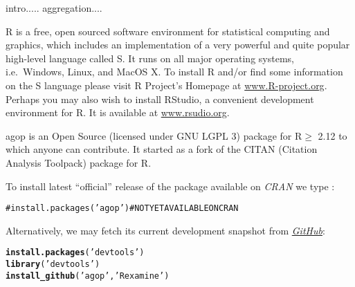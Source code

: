 \documentclass[11pt]{article}\usepackage{graphicx, color}
\makeatletter
\newcommand{\hlfunctioncall}[1]{\textcolor[rgb]{0.501960784313725,0,0.329411764705882}{\textbf{#1}}}%
\newcommand{\hlstring}[1]{\textcolor[rgb]{0.6,0.6,1}{#1}}%
\newcommand{\hlcomment}[1]{\textcolor[rgb]{0.180392156862745,0.6,0.341176470588235}{#1}}%
\newenvironment{kframe}{%
 \def\at@end@of@kframe{}%
 \ifinner\ifhmode%
  \def\at@end@of@kframe{\end{minipage}}%
  \begin{minipage}{\columnwidth}%
 \fi\fi%
 \def\FrameCommand##1{\hskip\@totalleftmargin \hskip-\fboxsep
 \colorbox{shadecolor}{##1}\hskip-\fboxsep
     \hskip-\linewidth \hskip-\@totalleftmargin \hskip\columnwidth}%
 \MakeFramed {\advance\hsize-\width
   \@totalleftmargin\z@ \linewidth\hsize
   \@setminipage}}%
 {\par\unskip\endMakeFramed%
 \at@end@of@kframe}
\newenvironment{knitrout}{}{} %
\newcommand{\package}[1]{\textsf{#1}\xspace}
\newcommand{\program}[1]{\textsf{#1}\xspace}
\newcommand{\os}[1]{\textsf{#1}\xspace}
\newcommand{\lang}[1]{\textsf{#1}\xspace}
\newcommand{\R}{\lang{R}}
\theoremstyle{remark}
\theoremstyle{definition}
\newif\ifDevelopmentVersion
\makeatother
\begin{document}
intro.....
aggregation.... \cite{GrabischETAL2009:aggregationfunctions}



\R \cite{Rproject:home} is a free, open sourced software environment
for statistical computing and graphics, which
includes an implementation
of a very powerful and quite popular high-level language called \lang{S}.
It runs on all major operating systems, i.e.~\os{Windows},
\os{Linux}, and \os{MacOS X}.
To install \R and/or find some information on the \lang{S} language
please visit \R Project's Homepage at \href{http://www.R-project.org}{www.R-project.org}.
Perhaps you may also wish to install  \program{RStudio},
a convenient development environment for \R.
It is available at \href{http://rstudio.org/}{www.rsudio.org}.


\bigskip
\package{agop} is an Open Source (licensed under GNU LGPL 3)
package for \R$\ge$ 2.12 to which anyone can contribute.
It started as a fork of the \package{CITAN} (Citation
Analysis Toolpack) package for \R.

To install latest ``official'' release of the 
package available on \textit{CRAN} we type%
\ifDevelopmentVersion%
\footnote{You are viewing the \textbf{development} version of the tutorial.
Some of the features presented in this document may be missing
in the CRAN release. Please, upgrade to the \textbf{latest} development version from
\href{https://github.com/Rexamine/agop}{\textit{GitHub}}
if you need the new functionality.}\ignorespaces
\fi%
:

\begin{knitrout}\small
{}\color{fgcolor}\begin{kframe}
\begin{alltt}
\hlcomment{# install.packages('agop') # NOT YET AVAILABLE ON CRAN}
\end{alltt}
\end{kframe}
\end{knitrout}


\noindent
Alternatively, we may fetch its current development snapshot
from \href{https://github.com/Rexamine/agop}{\textit{GitHub}}:

\begin{knitrout}\small
{}\color{fgcolor}\begin{kframe}
\begin{alltt}
\hlfunctioncall{install.packages}(\hlstring{'devtools'})
\hlfunctioncall{library}(\hlstring{'devtools'})
\hlfunctioncall{install_github}(\hlstring{'agop'}, \hlstring{'Rexamine'})
\end{alltt}
\end{kframe}
\end{knitrout}
\end{document}

